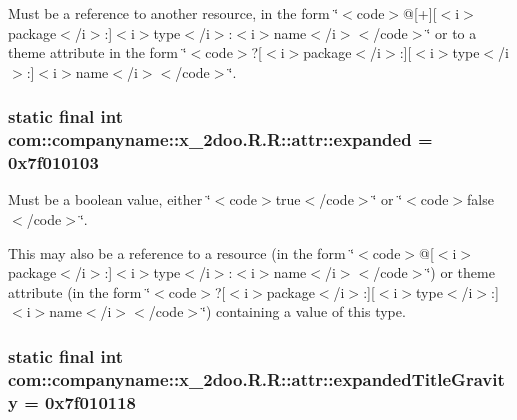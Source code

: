 Must be a reference to another resource, in the form \char`\"{}$<$code$>$@\mbox{[}+\mbox{]}\mbox{[}$<$i$>$package$<$/i$>$:\mbox{]}$<$i$>$type$<$/i$>$:$<$i$>$name$<$/i$>$$<$/code$>$\char`\"{} or to a theme attribute in the form \char`\"{}$<$code$>$?\mbox{[}$<$i$>$package$<$/i$>$:\mbox{]}\mbox{[}$<$i$>$type$<$/i$>$:\mbox{]}$<$i$>$name$<$/i$>$$<$/code$>$\char`\"{}. \hypertarget{classcom_1_1companyname_1_1x__2doo_1_1_r_1_1attr_6f1bafa424f8cd2d54eb859d809ce486}{
\subsubsection[{expanded}]{\setlength{\rightskip}{0pt plus 5cm}static final int com::companyname::x\_\-2doo.R.R::attr::expanded = 0x7f010103}}
\label{classcom_1_1companyname_1_1x__2doo_1_1_r_1_1attr_6f1bafa424f8cd2d54eb859d809ce486}


Must be a boolean value, either \char`\"{}$<$code$>$true$<$/code$>$\char`\"{} or \char`\"{}$<$code$>$false$<$/code$>$\char`\"{}. 

This may also be a reference to a resource (in the form \char`\"{}$<$code$>$@\mbox{[}$<$i$>$package$<$/i$>$:\mbox{]}$<$i$>$type$<$/i$>$:$<$i$>$name$<$/i$>$$<$/code$>$\char`\"{}) or theme attribute (in the form \char`\"{}$<$code$>$?\mbox{[}$<$i$>$package$<$/i$>$:\mbox{]}\mbox{[}$<$i$>$type$<$/i$>$:\mbox{]}$<$i$>$name$<$/i$>$$<$/code$>$\char`\"{}) containing a value of this type. \hypertarget{classcom_1_1companyname_1_1x__2doo_1_1_r_1_1attr_8a7bc05444491dc5cf47280086e1c076}{
\subsubsection[{expandedTitleGravity}]{\setlength{\rightskip}{0pt plus 5cm}static final int com::companyname::x\_\-2doo.R.R::attr::expandedTitleGravity = 0x7f010118}}
\label{classcom_1_1companyname_1_1x__2doo_1_1_r_1_1attr_8a7bc05444491dc5cf47280086e1c076}


